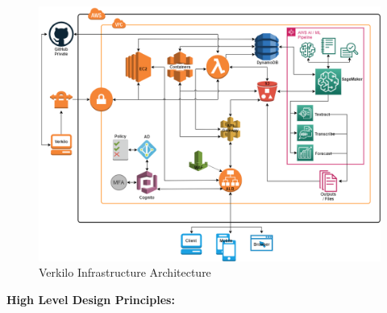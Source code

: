 \documentclass[11pt,openany]{book}
\begin{document}
\begin{figure}
\centering
\includegraphics{./media/verkilo-architecture.png}
\caption{Verkilo Infrastructure Architecture}
\end{figure}

\textbf{High Level Design Principles:}
\end{document}
